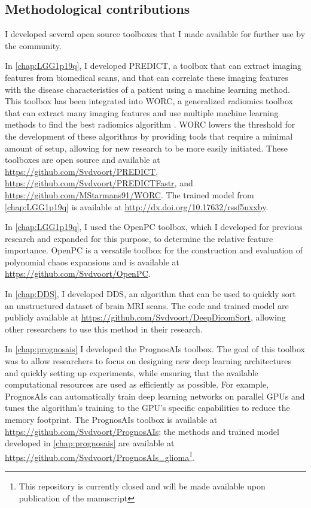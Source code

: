 \subsection{Methodological contributions}

I developed several open source toolboxes that I made available for further use by the community.

In \cref{chap:LGG1p19q}, I developed PREDICT, a toolbox that can extract imaging features from biomedical scans, and that can correlate these imaging features with the disease characteristics of a patient using a machine learning method.
This toolbox has been integrated into WORC, a generalized radiomics toolbox that can extract many imaging features and use multiple machine learning methods to find the best radiomics algorithm \autocite{mstarmans2020worc}.
WORC lowers the threshold for the development of these algorithms by providing tools that require a minimal amount of setup, allowing for new research to be more easily initiated.
These toolboxes are open source and available at \url{https://github.com/Svdvoort/PREDICT}, \url{https://github.com/Svdvoort/PREDICTFastr}, and \url{https://github.com/MStarmans91/WORC}.
The trained model from \cref{chap:LGG1p19q} is available at \url{http://dx.doi.org/10.17632/rssf5nxxby}.

In \cref{chap:LGG1p19q}, I used the OpenPC toolbox, which I developed for previous research and expanded for this purpose, to determine the relative feature importance.
OpenPC is a versatile toolbox for the construction and evaluation of polynomial chaos expansions and is available at \url{https://github.com/Svdvoort/OpenPC}.

In \cref{chap:DDS}, I developed \acrlong{DDS}, an algorithm that can be used to quickly sort an unstructured dataset of brain \gls{MRI} scans.
The code and trained model are publicly available at \url{https://github.com/Svdvoort/DeepDicomSort}, allowing other researchers to use this method in their research.


In \cref{chap:prognosais} I developed the PrognosAIs toolbox.
The goal of this toolbox was to allow researchers to focus on designing new deep learning architectures and quickly setting up experiments, while ensuring that the available computational resources are used as efficiently as possible.
For example, PrognosAIs can automatically train deep learning networks on parallel GPUs and tunes the algorithm's training to the GPU's specific capabilities to reduce the memory footprint.
The PrognosAIs toolbox is available at \url{https://github.com/Svdvoort/PrognosAIs}; the methods and trained model developed in \cref{chap:prognosais} are available at \url{https://github.com/Svdvoort/PrognosAIs_glioma}\footnote{This repository is currently closed and will be made available upon publication of the manuscript}.

